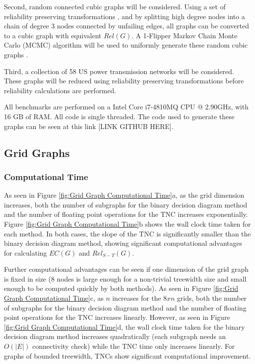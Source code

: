 \documentclass[12pt,twocolumn]{article}
\begin{document}
Second, random connected cubic graphs will be considered. Using a set of reliability preserving transformations \cite{shooman1991exact}, and by splitting high degree nodes into a chain of degree 3 nodes connected by unfailing edges, all graphs can be converted to a cubic graph with equivalent \(Rel(G)\). A 1-Flipper Markov Chain Monte Carlo (MCMC) algorithm will be used to uniformly generate these random cubic graphs \cite{feder2006local}.

Third, a collection of 58 US power transmission networks \cite{li2016characterizing} will be considered. These graphs will be reduced using reliability preserving transformations before reliability calculations are performed.

All benchmarks are performed on a Intel Core i7-4810MQ CPU @ 2.90GHz, with 16 GB of RAM. All code is single threaded. The code used to generate these graphs can be seen at this link {[}LINK GITHUB HERE{]}.

\hypertarget{grid-graphs}{%
\subsection{Grid Graphs}\label{grid-graphs}}

\hypertarget{computational-time}{%
\subsubsection{Computational Time}\label{computational-time}}

As seen in Figure \ref{fig:Grid Graph Computational Time}a, as the grid dimension increases, both the number of subgraphs for the binary decision diagram method and the number of floating point operations for the TNC increases exponentially. Figure \ref{fig:Grid Graph Computational Time}b shows the wall clock time taken for each method. In both cases, the slope of the TNC is significantly smaller than the binary decision diagram method, showing significant computational advantages for calculating \(EC(G)\) and \(Rel_{S-T}(G)\).

Further computational advantages can be seen if one dimension of the grid graph is fixed in size (8 nodes is large enough for a non-trivial treewidth size and small enough to be computed quickly by both methods). As seen in Figure \ref{fig:Grid Graph Computational Time}c, as \(n\) increases for the \(8xn\) grids, both the number of subgraphs for the binary decision diagram method and the number of floating point operations for the TNC increases linearly. However, as seen in Figure \ref{fig:Grid Graph Computational Time}d, the wall clock time taken for the binary decision diagram method increases quadratically (each subgraph needs an \(O(|E|)\) connectivity check) while the TNC time only increases linearly. For graphs of bounded treewidth, TNCs show significant computational improvement.
\end{document}
